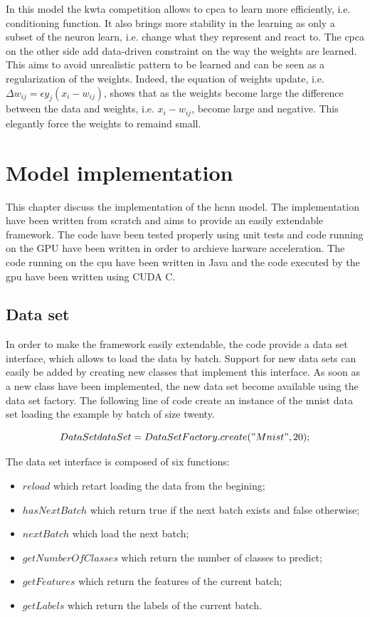 \documentclass[11pt]{report}
\begin{document}
\noindent In this model the \acrshort{kwta} competition allows to \acrshort{cpca} to learn more efficiently, i.e. conditioning function. It also brings more stability in the learning as only a subset of the neuron learn, i.e. change what they represent and react to. The \acrshort{cpca} on the other side add data-driven constraint on the way the weights are learned. This aims to avoid unrealistic pattern to be learned and can be seen as a regularization of the weights. Indeed, the equation of weights update, i.e. $\Delta w_{ij} = \epsilon y_j (x_i - w_{ij})$, shows that as the weights become large the difference between the data and weights, i.e. $x_i - w_{ij}$, become large and negative. This elegantly force the weights to remaind small.

\chapter{Model implementation} \label{model_implementation}

This chapter discuss the implementation of the \acrshort{hcnn} model. The implementation have been written from scratch and aims to provide an easily extendable framework. The code have been tested properly using unit tests and code running on the GPU have been written in order to archieve harware acceleration. The code running on the \acrshort{cpu} have been written in Java and the code executed by the \acrshort{gpu} have been written using CUDA C.

\section{Data set}

In order to make the framework easily extendable, the code provide a data set interface, which allows to load the data by batch. Support for new data sets can easily be added by creating new classes that implement this interface. As soon as a new class have been implemented, the new data set become available using the data set factory. The following line of code create an instance of the mnist data set loading the example by batch of size twenty.

$$DataSet dataSet = DataSetFactory.create("Mnist", 20);$$

\vspace{0.3cm}

\noindent The data set interface is composed of six functions:
\begin{itemize}
	\item $reload$ which retart loading the data from the begining;
	\item $hasNextBatch$ which return true if the next batch exists and false otherwise;
	\item $nextBatch$ which load the next batch;
	\item $getNumberOfClasses$ which return the number of classes to predict;
	\item $getFeatures$ which return the features of the current batch;
	\item $getLabels$ which return the labels of the current batch.
\end{itemize}
\end{document}
